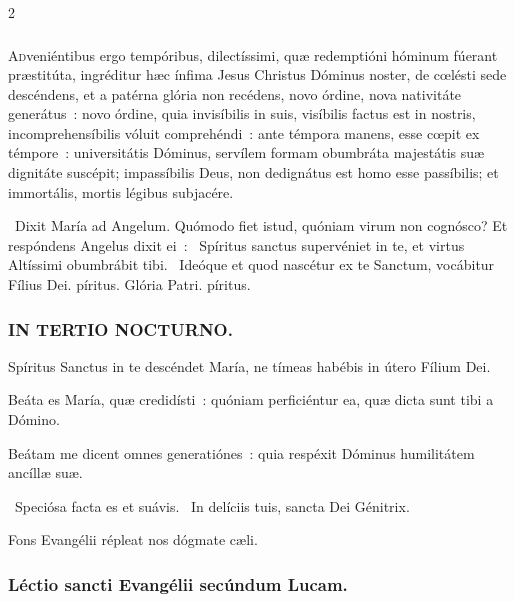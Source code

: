 \documentclass[9pt,twoside]{extarticle}
\begin{document}
\begin{multicols}{2}
\subsubsection*{\center {}}
\lettrine{A}dveniéntibus ergo tempóribus, dilectíssimi, quæ redemptióni hóminum fúerant præstitúta, ingréditur hæc ínfima Jesus Christus Dóminus noster, de cœlésti sede descéndens, et a patérna glória non recédens, novo órdine, nova nativitáte generátus~: novo órdine, quia invisíbilis in suis, visíbilis factus est in nostris, incomprehensíbilis vóluit comprehéndi~: ante témpora manens, esse cœpit ex témpore~: universitátis Dóminus, servílem formam obumbráta majestátis suæ dignitáte suscépit; impassíbilis Deus, non dedignátus est homo esse passíbilis; et immortális, mortis légibus subjacére.

\begin{tightlist}{}
\item {}~Dixit María ad Angelum. Quómodo fiet istud, quóniam virum non cognósco? Et respóndens Angelus dixit ei~: \textred{*}~Spíritus sanctus supervéniet in te, et virtus Altíssimi obumbrábit tibi. ~Ideóque et quod nascétur ex te Sanctum, vocábitur Fílius Dei. píritus. Glória Patri. píritus.
\end{tightlist}

\subsubsection*{\center \textsc{IN TERTIO NOCTURNO.}}
\begin{tightlist}{}
\item {} Spíritus Sanctus in te descéndet María, ne tímeas habébis in útero Fílium Dei.
\item {} Beáta es María, quæ credidísti~: quóniam perficiéntur ea, quæ dicta sunt tibi a Dómino.
\item {} Beátam me dicent omnes generatiónes~: quia respéxit Dóminus humilitátem ancíllæ suæ.
\item {}~Speciósa facta es et suávis. ~In delíciis tuis, sancta Dei Génitrix.
\item {\small {} Fons Evangélii répleat nos dógmate cæli.}
\end{tightlist}

\subsubsection*{\center Léctio sancti Evangélii secúndum Lucam.}

\end{multicols}
\end{document}
